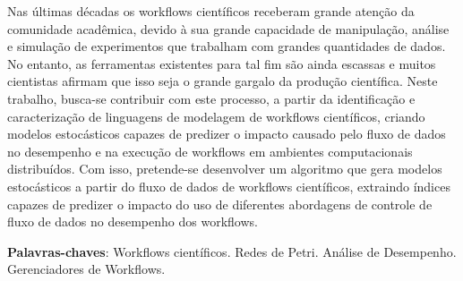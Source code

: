 \begin{resumo}

	Nas últimas décadas os workflows científicos receberam grande atenção da comunidade acadêmica, devido à sua grande capacidade de manipulação, análise e simulação de experimentos que trabalham com grandes quantidades de dados. No entanto, as ferramentas existentes para tal fim são ainda escassas e muitos cientistas afirmam que isso seja o grande gargalo da produção científica. Neste trabalho, busca-se contribuir com este processo, a partir da identificação e caracterização de linguagens de modelagem de workflows científicos, criando modelos estocásticos capazes de predizer o impacto causado pelo fluxo de dados no desempenho e na execução de workflows em ambientes computacionais distribuídos. Com isso, pretende-se desenvolver um algoritmo que gera modelos estocásticos a partir do fluxo de dados de workflows científicos, extraindo índices capazes de predizer o impacto do uso de diferentes abordagens de controle de fluxo de dados no desempenho dos workflows.

 \vspace{\onelineskip}
 
 \noindent
 \textbf{Palavras-chaves}: Workflows científicos. Redes de Petri. Análise de Desempenho. Gerenciadores de Workflows.
\end{resumo}
